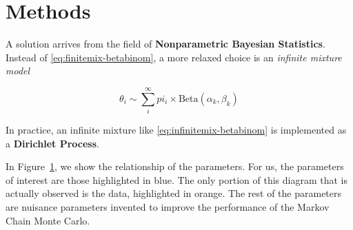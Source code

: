\documentclass{article}
\begin{document}
\section{Methods}

A solution arrives from the field of \textbf{Nonparametric Bayesian Statistics}. Instead of \eqref{eq:finitemix-betabinom}, a more relaxed choice is an \textit{infinite mixture model}

\begin{equation}\label{eq:infinitemix-betabinom}
\theta_i \sim \sum_i^{\infty} pi_i \times \text{Beta}(\alpha_k, \beta_k)
\end{equation}

In practice, an infinite mixture like \eqref{eq:infinitemix-betabinom} is implemented as a \textbf{Dirichlet Process}.

\begin{figure}
\centering
{}
\label{fig:diagram}
\end{figure}


In Figure~\ref{fig:diagram}, we show the relationship of the parameters. For us, the parameters of interest are those highlighted in {\color{blue}blue}. The only portion of this diagram that is actually observed is the data, highlighted in {\color{orange}orange}. The rest of the parameters are nuisance parameters invented to improve the performance of the Markov Chain Monte Carlo.
\end{document}
